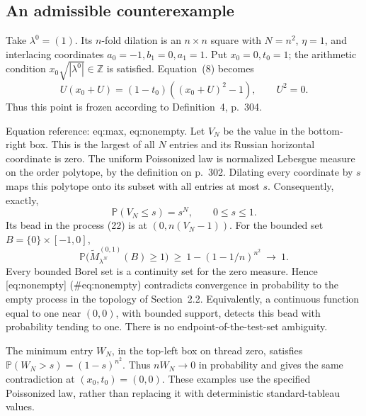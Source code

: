 \documentclass[10pt]{article}
\begin{document}
\subsection*{An admissible counterexample}
Take \(\lambda^0=(1)\). Its \(n\)-fold dilation is an \(n\times n\) square with \(N=n^2\), \(\eta=1\), and interlacing coordinates \(a_0=-1,b_1=0,a_1=1\). Put \(x_0=0,t_0=1\); the arithmetic condition \(x_0\sqrt{|\lambda^0|}\in\mathbb Z\) is satisfied. Equation (8) becomes \[U(x_0+U)=(1-t_0)((x_0+U)^2-1),\qquad U^2=0.\] Thus this point is frozen according to Definition 4, p. 304.\par
Equation reference: eq:max, eq:nonempty. Let \(V_N\) be the value in the bottom-right box. This is the largest of all \(N\) entries and its Russian horizontal coordinate is zero. The uniform Poissonized law is normalized Lebesgue measure on the order polytope, by the definition on p. 302. Dilating every coordinate by \(s\) maps this polytope onto its subset with all entries at most \(s\). Consequently, exactly, \[
 \mathbb P(V_N\le s)=s^{N},\qquad 0\le s\le1.\] Its bead in the process (22) is at \((0,n(V_N-1))\). For the bounded set \(B=\{0\}\times[-1,0]\), \[
 \mathbb P\bigl(\widetilde M_{\lambda^N}^{(0,1)}(B)\ge1\bigr)
 \ \ge\ 1-(1-1/n)^{n^2}\ \longrightarrow\ 1 .\] Every bounded Borel set is a continuity set for the zero measure. Hence [eq:nonempty] (\#eq:nonempty) contradicts convergence in probability to the empty process in the topology of Section 2.2. Equivalently, a continuous function equal to one near \((0,0)\), with bounded support, detects this bead with probability tending to one. There is no endpoint-of-the-test-set ambiguity.\par
The minimum entry \(W_N\), in the top-left box on thread zero, satisfies \(\mathbb P(W_N>s)=(1-s)^{n^2}\). Thus \(nW_N\to0\) in probability and gives the same contradiction at \((x_0,t_0)=(0,0)\). These examples use the specified Poissonized law, rather than replacing it with deterministic standard-tableau values.\par
\end{document}
